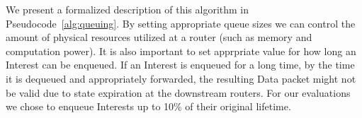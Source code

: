 We present a formalized description of this algorithm in Pseudocode~\ref{alg:queuing}. 
By setting appropriate queue sizes we can control the amount of physical resources utilized at a router (such as memory and computation power). 
It is also important to set apprpriate value for how long an Interest can be enqueued. 
If an Interest is enqueued for a long time, by the time it is dequeued and appropriately forwarded, the resulting Data packet might not be valid due to state expiration at the downstream routers. 
For our evaluations we chose to enqueue Interests up to 10\% of their original lifetime.






